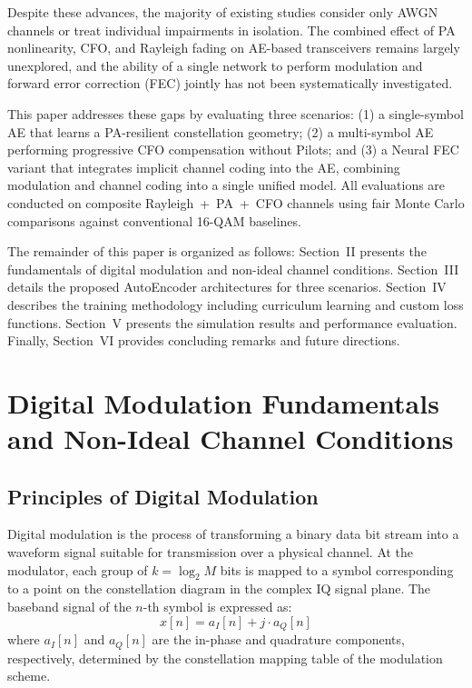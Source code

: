 \documentclass[a4paper,14pt]{extreport}
\begin{document}
Despite these advances, the majority of existing studies consider only AWGN channels or treat individual impairments in isolation. The combined effect of PA nonlinearity, CFO, and Rayleigh fading on AE-based transceivers remains largely unexplored, and the ability of a single network to perform modulation and forward error correction (FEC) jointly has not been systematically investigated.

This paper addresses these gaps by evaluating three scenarios: (1) a single-symbol AE that learns a PA-resilient constellation geometry; (2) a multi-symbol AE performing progressive CFO compensation without Pilots; and (3) a Neural FEC variant that integrates implicit channel coding into the AE, combining modulation and channel coding into a single unified model. All evaluations are conducted on composite Rayleigh~+~PA~+~CFO channels using fair Monte Carlo comparisons against conventional 16-QAM baselines.

The remainder of this paper is organized as follows: Section~II presents the fundamentals of digital modulation and non-ideal channel conditions. Section~III details the proposed AutoEncoder architectures for three scenarios. Section~IV describes the training methodology including curriculum learning and custom loss functions. Section~V presents the simulation results and performance evaluation. Finally, Section~VI provides concluding remarks and future directions.

\section{Digital Modulation Fundamentals and Non-Ideal Channel Conditions}

\subsection{Principles of Digital Modulation}

Digital modulation is the process of transforming a binary data bit stream into a waveform signal suitable for transmission over a physical channel. At the modulator, each group of $k = \log_2 M$ bits is mapped to a symbol corresponding to a point on the constellation diagram in the complex IQ signal plane. The baseband signal of the $n$-th symbol is expressed as:
\begin{equation}
x[n] = a_I[n] + j \cdot a_Q[n]
\end{equation}
where $a_I[n]$ and $a_Q[n]$ are the in-phase and quadrature components, respectively, determined by the constellation mapping table of the modulation scheme.
\end{document}
